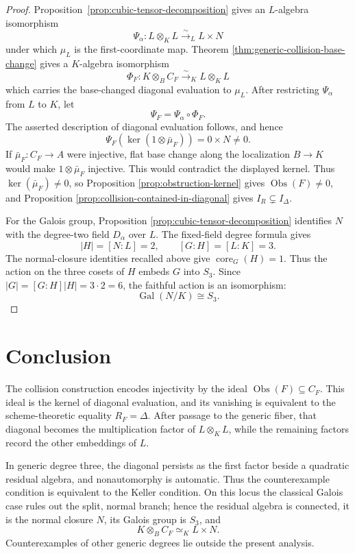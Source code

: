 \documentclass[11pt]{article}
\theoremstyle{remark}
\DeclareMathOperator{\Gal}{Gal}
\DeclareMathOperator{\core}{core}
\newcommand{\Obs}{\operatorname{Obs}}
\begin{document}
\begin{proof}
Proposition~\ref{prop:cubic-tensor-decomposition} gives an \(L\)-algebra
isomorphism
\[
  \Psi_\alpha\colon L\otimes_KL\xrightarrow{\sim}_L L\times N
\]
under which \(\mu_L\) is the first-coordinate map.  Theorem
\ref{thm:generic-collision-base-change} gives a \(K\)-algebra isomorphism
\[
  \Phi_F\colon K\otimes_BC_F\xrightarrow{\sim}_K L\otimes_KL
\]
which carries the base-changed diagonal evaluation to \(\mu_L\).
After restricting \(\Psi_\alpha\) from \(L\) to \(K\), let
\[
  \Psi_F=\Psi_\alpha\circ\Phi_F.
\]
The asserted description of diagonal evaluation follows, and hence
\[
  \Psi_F\!\left(
    \ker(1\otimes\bar\mu_F)
  \right)
  =0\times N\neq0.
\]
If \(\bar\mu_F\colon C_F\to A\) were injective, flat base change along
the localization \(B\to K\) would make \(1\otimes\bar\mu_F\) injective.
This would contradict the displayed kernel.  Thus
\(\ker(\bar\mu_F)\neq0\), so Proposition
\ref{prop:obstruction-kernel} gives \(\Obs(F)\neq0\), and Proposition
\ref{prop:collision-contained-in-diagonal} gives
\(I_R\subsetneq I_\Delta\).

For the Galois group, Proposition
\ref{prop:cubic-tensor-decomposition} identifies \(N\) with the
degree-two field \(D_\alpha\) over \(L\).  The fixed-field degree formula
\cite{StacksFundamentalGaloisTheory} gives
\[
  |H|=[N:L]=2,
  \qquad
  [G:H]=[L:K]=3.
\]
The normal-closure identities recalled above give \(\core_G(H)=1\).
Thus the action on the three cosets of \(H\) embeds \(G\) into \(S_3\).
Since \(|G|=[G:H]|H|=3\cdot2=6\), the faithful action is an isomorphism:
\[
  \Gal(N/K)\cong S_3.
\]
\end{proof}

\section{Conclusion}
\label{sec:conclusion}

The collision construction encodes injectivity by the ideal
\(\Obs(F)\subseteq C_F\).  This ideal is the kernel of diagonal evaluation,
and its vanishing is equivalent to the scheme-theoretic equality
\(R_F=\Delta\).
After passage to the generic fiber, that diagonal becomes the
multiplication factor of \(L\otimes_KL\), while the remaining factors
record the other embeddings of \(L\).

In generic degree three, the diagonal persists as the first factor beside
a quadratic residual algebra, and nonautomorphy is automatic.  Thus the
counterexample condition is equivalent to the Keller condition.  On this
locus the classical Galois case rules out the split, normal branch; hence
the residual algebra is connected, it is the normal closure \(N\), its
Galois group is \(S_3\), and
\[
  K\otimes_BC_F\simeq_K L\times N.
\]
Counterexamples of other generic degrees lie outside the present analysis.
\end{document}
